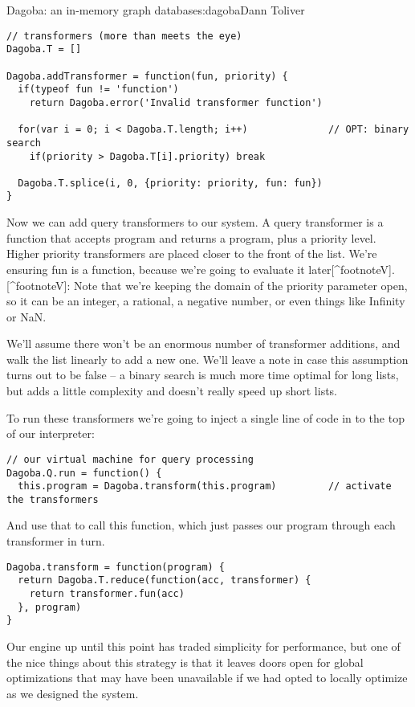 \begin{aosachapter}{Dagoba: an in-memory graph database}{s:dagoba}{Dann Toliver}
\begin{verbatim}
// transformers (more than meets the eye)
Dagoba.T = []                                           

Dagoba.addTransformer = function(fun, priority) {
  if(typeof fun != 'function')
    return Dagoba.error('Invalid transformer function') 
  
  for(var i = 0; i < Dagoba.T.length; i++)              // OPT: binary search
    if(priority > Dagoba.T[i].priority) break
  
  Dagoba.T.splice(i, 0, {priority: priority, fun: fun})
}
\end{verbatim}

Now we can add query transformers to our system. A query transformer is
a function that accepts program and returns a program, plus a priority
level. Higher priority transformers are placed closer to the front of
the list. We're ensuring fun is a function, because we're going to
evaluate it later{[}\^{}footnoteV{]}. {[}\^{}footnoteV{]}: Note that
we're keeping the domain of the priority parameter open, so it can be an
integer, a rational, a negative number, or even things like Infinity or
NaN.

We'll assume there won't be an enormous number of transformer additions,
and walk the list linearly to add a new one. We'll leave a note in case
this assumption turns out to be false -- a binary search is much more
time optimal for long lists, but adds a little complexity and doesn't
really speed up short lists.

To run these transformers we're going to inject a single line of code in
to the top of our interpreter:

\begin{verbatim}
// our virtual machine for query processing
Dagoba.Q.run = function() {                             
  this.program = Dagoba.transform(this.program)         // activate the transformers
\end{verbatim}

And use that to call this function, which just passes our program
through each transformer in turn.

\begin{verbatim}
Dagoba.transform = function(program) {
  return Dagoba.T.reduce(function(acc, transformer) {
    return transformer.fun(acc)
  }, program)
}
\end{verbatim}

Our engine up until this point has traded simplicity for performance,
but one of the nice things about this strategy is that it leaves doors
open for global optimizations that may have been unavailable if we had
opted to locally optimize as we designed the system.


\end{aosachapter}
